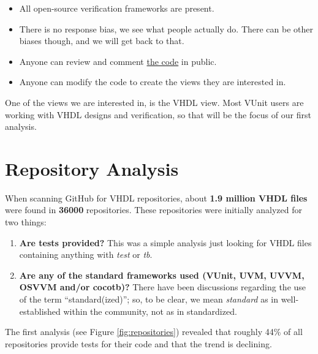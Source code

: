 \documentclass[]{report}
\providecommand{\tightlist}{%
  \setlength{\itemsep}{0pt}\setlength{\parskip}{0pt}}
\begin{document}
\begin{itemize}
\tightlist
\item
  All open-source verification frameworks are present.
\item
  There is no response bias, we see what people actually do. There can be other biases though, and we will get back to that.
\item
  Anyone can review and comment \href{https://github.com/LarsAsplund/github-facts/tree/main/py}{the code} in public.
\item
  Anyone can modify the code to create the views they are interested in.
\end{itemize}

One of the views we are interested in, is the VHDL view. Most VUnit users are working with VHDL designs and verification, so that will be the focus of our first analysis.

\hypertarget{repository-analysis}{%
\section{Repository Analysis}\label{repository-analysis}}

When scanning GitHub for VHDL repositories, about \textbf{1.9 million VHDL files} were found in \textbf{36000} repositories. These repositories were initially analyzed for two things:

\begin{enumerate}
\def\labelenumi{\arabic{enumi}.}
\tightlist
\item
  \textbf{Are tests provided?} This was a simple analysis just looking for VHDL files containing anything with \emph{test} or \emph{tb}.
\item
  \textbf{Are any of the standard frameworks used (VUnit, UVM, UVVM, OSVVM and/or cocotb)?} There have been discussions regarding the use of the term ``standard(ized)''; so, to be clear, we mean \emph{standard} as in well-established within the community, not as in standardized.
\end{enumerate}

The first analysis (see Figure \ref{fig:repositories}) revealed that roughly 44\% of all repositories provide tests for their code and that the trend is declining.
\end{document}
